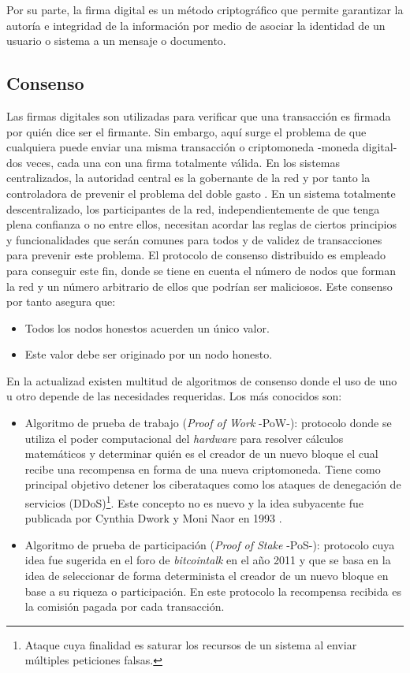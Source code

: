 \documentclass[12pt,a4paper, twoside]{report}
\begin{document}
	Por su parte, la firma digital es un método criptográfico que permite garantizar la autoría e integridad de la información por medio de asociar la identidad de un usuario o sistema a un mensaje o documento.

	\subsection{Consenso}
	
	Las firmas digitales son utilizadas para verificar que una transacción es firmada por quién dice ser el firmante. Sin embargo, aquí surge el problema de que cualquiera puede enviar una misma transacción o criptomoneda -moneda digital- dos veces, cada una con una firma totalmente válida. En los sistemas centralizados, la autoridad central es la gobernante de la red y por tanto la controladora de prevenir el problema del doble gasto \cite{karame:2012:double}. En un sistema totalmente descentralizado, los participantes de la red, independientemente de que tenga plena confianza o no entre ellos, necesitan acordar las reglas de ciertos principios y funcionalidades que serán comunes para todos y de validez de transacciones para prevenir este problema. El protocolo de consenso distribuido es empleado para conseguir este fin, donde se tiene en cuenta el número de nodos que forman la red y un número arbitrario de ellos que podrían ser maliciosos. Este consenso por tanto asegura que:
	
	\begin{itemize}
		\item Todos los nodos honestos acuerden un único valor.
		\item Este valor debe ser originado por un nodo honesto.
	\end{itemize}
			
	 En la actualizad existen multitud de algoritmos de consenso donde el uso de uno u otro depende de las necesidades requeridas. Los más conocidos son:
	 	 
	 \begin{itemize}
	 	\item Algoritmo de prueba de trabajo (\textit{Proof of Work} -PoW-): protocolo donde se utiliza el poder computacional del \textit{hardware} para resolver cálculos matemáticos y determinar quién es el creador de un nuevo bloque el cual recibe una recompensa en forma de una nueva criptomoneda. Tiene como principal objetivo detener los ciberataques como los ataques de denegación de servicios (DDoS)\footnote{Ataque cuya finalidad es saturar los recursos de un sistema al enviar múltiples peticiones falsas.}. Este concepto no es nuevo y la idea subyacente fue publicada por Cynthia Dwork y Moni Naor en 1993 \cite{dwork:1993}.
	 	\item Algoritmo de prueba de participación (\textit{Proof of Stake} -PoS-): protocolo cuya idea fue sugerida en el foro de \textit{bitcointalk} en el año 2011 y que se basa en la idea de seleccionar de forma determinista el creador de un nuevo bloque en base a su riqueza o participación. En este protocolo la recompensa recibida es la comisión pagada por cada transacción.
	 \end{itemize}
	
\end{document}
